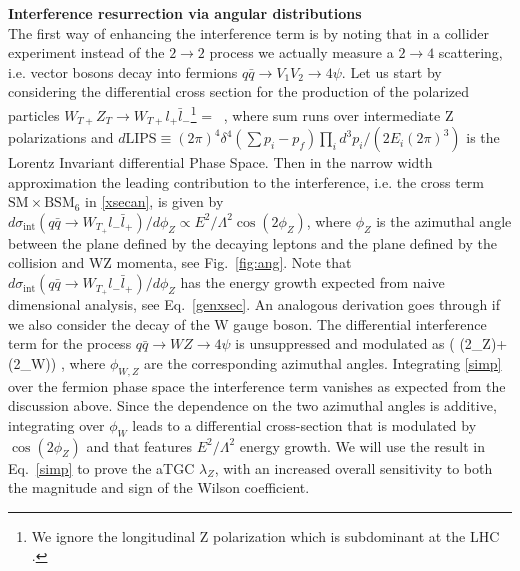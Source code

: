 \noindent
{\bf Interference resurrection via angular distributions}\\
\label{angs}
The first way of enhancing the interference term is by noting that in a collider experiment instead of the  $2\to 2$ process we actually measure a $2\to 4$ scattering, i.e. vector bosons decay into fermions $q\bar q\to V_1V_2\to 4 \psi$.  
%
Let us start by considering  the differential cross section for the production of the polarized particles $W_{T+} Z_T \rightarrow W_{T+}  l_+ \bar l_-$\footnote{ We ignore the  longitudinal Z polarization which is subdominant at the LHC \cite{Baur:1994ia}.}
\be
{} =
    
\,  , \label{xsecan}
\ee
where   sum runs over intermediate Z polarizations and $d\text{LIPS}\equiv (2\pi)^4\delta^4(\sum p_i -p_f) \prod_i {d^3 p_i}/\left(2 E_i(2\pi)^3\right)$ is the Lorentz Invariant differential 
Phase Space.  
%
Then in the narrow width approximation the leading contribution to the interference, i.e. the cross term $\text{SM}\times\text{BSM}_6$ in \ref{xsecan},   is given by
$
d\sigma_\text{int}(q\bar q \rightarrow W_{T_+} l_- \bar l_+)/ d\phi_Z \propto E^2/\Lambda^2 \cos(2\phi_Z) 
$, 
where  $\phi_Z$  is the azimuthal angle between the plane defined by the decaying leptons and the plane defined by the collision and WZ momenta, see Fig.~\ref{fig:ang}.  Note that $d\sigma_\text{int}(q\bar q \rightarrow W_{T_+} l_- \bar l_+)/ d\phi_Z $ has the energy growth expected from naive dimensional analysis, see  Eq.~\ref{genxsec}.
An analogous derivation goes through if we also consider the decay of the W gauge boson. The differential interference term   for the process $q\bar q\to WZ\to 4 \psi$ is  unsuppressed and modulated as
\bea
   \propto {}\left( \cos(2\phi_Z)+\cos(2\phi_W)\right) , \label{simp}
\eea
where $\phi_{W,Z}$ are the corresponding azimuthal angles. 
Integrating  \ref{simp} over the fermion phase space the   interference term vanishes as expected from the discussion above. 
Since the dependence on the two azimuthal angles is additive, integrating  over $\phi_W$ leads to a differential cross-section that is modulated by $\cos(2\phi_Z)$ and that features $E^2/\Lambda^2$ energy growth. 
We will use the result in Eq.~\ref{simp}  to prove the aTGC $\lambda_Z$, with an increased  overall sensitivity  to both the magnitude and sign of the Wilson coefficient.


